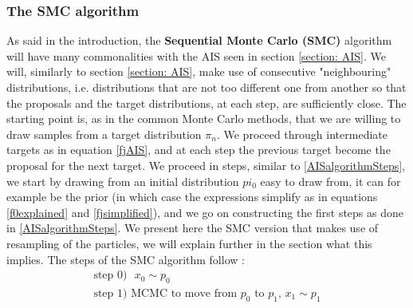 \documentclass[12pt,mythesisstyle]{report}
\begin{document}
\subsubsection{The SMC algorithm}
As said in the introduction, the \textbf{Sequential Monte Carlo (SMC)} algorithm will have many commonalities with the AIS seen in section \ref{section: AIS}. We will, similarly to section \ref{section: AIS}, make use of consecutive "neighbouring" distributions, i.e. distributions that are not too different one from another so that the proposals and the target distributions, at each step, are sufficiently close. The starting point is, as in the common Monte Carlo methods, that we are willing to draw samples from a target distribution $\pi_n$. We proceed through intermediate targets as in equation \eqref{fjAIS}, and at each step the previous target become the proposal for the next target. We proceed in steps, similar to \eqref{AISalgorithmSteps}, we start by drawing from an initial distribution $pi_0$ easy to draw from, it can for example be the prior (in which case the expressions simplify as in equations \eqref{f0explained} and \eqref{fjsimplified}), and we go on constructing the first steps as done in \eqref{AISalgorithmSteps}. We present here the SMC version that makes use of resampling of the particles, we will explain further in the section what this implies. The steps of the SMC algorithm follow \cite{sequentialmcsamplersdelmoral}:
\begin{equation}\label{SMCalgorithmSteps1}
\begin{aligned}
\text{step 0)}  \text{ }x_{0}\sim p_{0} \\
\text{step 1)} \text{ MCMC to move from } p_0 \text{ to } p_1\text{, }x_{1}\sim p_{1}\\
\end{aligned}
\end{equation}
\end{document}

